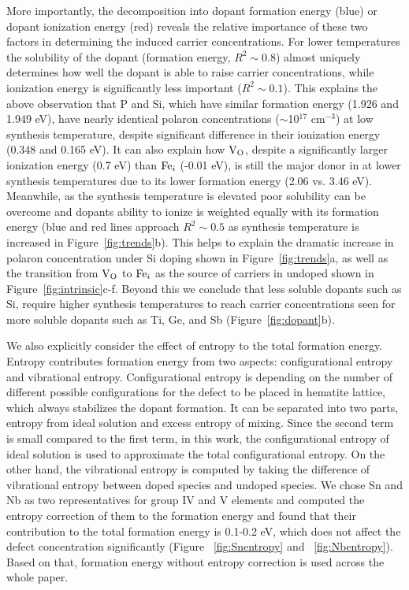 More importantly, the decomposition into dopant formation energy (blue) or dopant ionization energy (red) reveals the relative importance of these two factors in determining the induced carrier concentrations.
 For lower temperatures the solubility of the dopant (formation energy, $R^2 \sim 0.8$) almost uniquely determines how well the dopant is able to raise carrier concentrations, while ionization energy is significantly less important ($R^2 \sim 0.1$).
 This explains the above observation that P and Si, which have similar formation energy (1.926 and 1.949 eV), have nearly identical polaron concentrations ($\sim$10$^{17}$ cm$^{-3}$) at low synthesis temperature, despite significant difference in their ionization energy (0.348 and 0.165 eV).
 It can also explain how $\text{V}_\text{O}$, despite a significantly larger ionization energy (0.7 eV) than $\text{Fe}_i$ (-0.01 eV), is still the major donor in  at lower synthesis temperatures due to its lower formation energy (2.06 vs. 3.46 eV).
 Meanwhile, as the synthesis temperature is elevated poor solubility can be overcome and dopants ability to ionize is weighted equally with its formation energy (blue and red lines approach $R^2 \sim 0.5$ as synthesis temperature is increased in Figure~\ref{fig:trends}b).
 This helps to explain the dramatic increase in polaron concentration under Si doping shown in Figure~\ref{fig:trends}a, as well as the transition from $\text{V}_\text{O}$ to $\text{Fe}_i$ as the source of carriers in undoped  shown in Figure~\ref{fig:intrinsic}c-f.
 Beyond this we conclude that less soluble dopants such as Si, require higher synthesis temperatures to reach carrier concentrations seen for more soluble dopants such as Ti, Ge, and Sb (Figure~\ref{fig:dopant}b).

 We also explicitly consider the effect of entropy to the total formation energy. Entropy contributes formation energy from two aspects: configurational entropy and vibrational entropy. Configurational entropy is depending on the number of different possible configurations for the defect to be placed in hematite lattice, which always stabilizes the dopant formation. It can be separated into two parts, entropy from ideal solution and excess entropy of mixing. Since the second term is small compared to the first term,\cite{ye2015generalized, ye2016high} in this work, the configurational entropy of ideal solution is used to approximate the total configurational entropy. On the other hand, the vibrational entropy is computed by taking the difference of vibrational entropy between doped species and undoped species. We chose Sn and Nb as two representatives for group IV and V elements and computed the entropy correction of them to the formation energy and found that their contribution to the total formation energy is 0.1-0.2 eV, which does not affect the defect concentration significantly (Figure ~\ref{fig:Snentropy} and ~\ref{fig:Nbentropy}). Based on that, formation energy without entropy correction is used across the whole paper.

